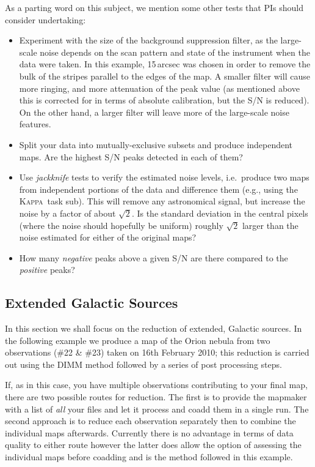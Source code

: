 \documentclass[twoside,11pt]{article}
\newcommand{\xref}[3]{#1}
\newcommand{\xlabel}[1]{}
\renewcommand{\_}{\texttt{\symbol{95}}}
\newcommand{\Kappa}{\xref{\textsc{Kappa}}{sun95}{}}
\newcommand{\task}[1]{\textsf{#1}}
\newcommand{\sub}{\xref{\task{sub}}{sun95}{SUB}}
\begin{document}
As a parting word on this subject, we mention some other tests that
PIs should consider undertaking:

\begin{itemize}

\item Experiment with the size of the background suppression filter,
  as the large-scale noise depends on the scan pattern and state of
  the instrument when the data were taken. In this example, 15\,arcsec
  was chosen in order to remove the bulk of the stripes parallel to
  the edges of the map. A smaller filter will cause more ringing, and
  more attenuation of the peak value (as mentioned above this is
  corrected for in terms of absolute calibration, but the S/N is
  reduced). On the other hand, a larger filter will leave more of the
  large-scale noise features.

\item Split your data into mutually-exclusive subsets and produce
  independent maps. Are the highest S/N peaks detected in each of
  them?

\item Use {\em jackknife} tests to verify the estimated noise levels,
  i.e.~produce two maps from independent portions of the data and
  difference them (e.g., using the \Kappa\ task \sub). This will
  remove any astronomical signal, but increase the noise by a factor
  of about $\sqrt{2}$. Is the standard deviation in the central pixels
  (where the noise should hopefully be uniform) roughly $\sqrt{2}$
  larger than the noise estimated for either of the original maps?

\item How many {\em negative} peaks above a given S/N are there
  compared to the {\em positive} peaks?

\end{itemize}

\subsection{\xlabel{Galactic}Extended Galactic Sources}
\label{sec:galactic}
In this section we shall focus on the reduction of extended, Galactic
sources. In the following example we produce a map of the Orion nebula
from two observations (\#22 \& \#23) taken on 16th February 2010; this
reduction is carried out using the DIMM method followed by a series of
post processing steps.

If, as in this case, you have multiple observations contributing to
your final map, there are two possible routes for reduction. The first
is to provide the mapmaker with a list of \emph{all} your files and
let it process and coadd them in a single run.  The second approach is
to reduce each observation separately then to combine the individual
maps afterwards. Currently there is no advantage in terms of data
quality to either route however the latter does allow the option of
assessing the individual maps before coadding and is the method
followed in this example.
\end{document}
